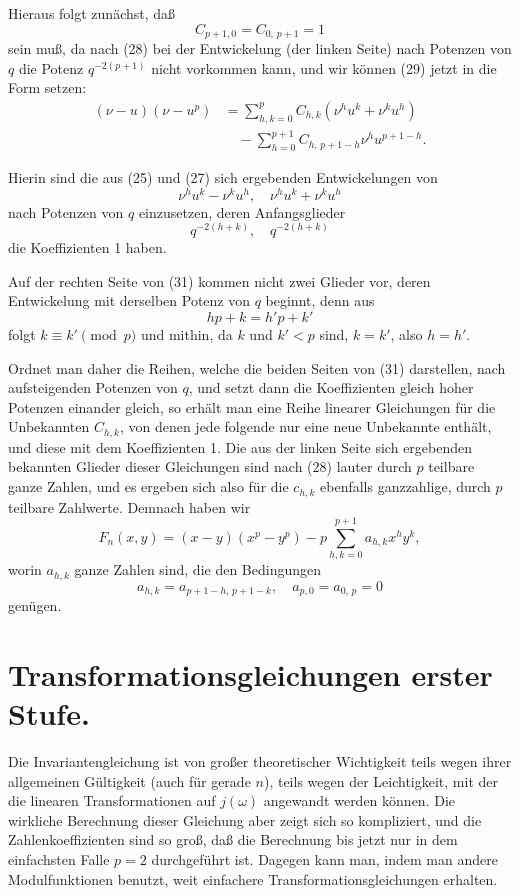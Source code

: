\documentclass[12pt,a4paper]{article}
\theoremstyle{definition}
\begin{document}
Hieraus folgt zunächst, daß
\[
C_{p+1,0} = C_{0,\,p+1} = 1
\]
sein muß, da nach (28) bei der Entwickelung (der linken Seite) nach Potenzen von $q$ die Potenz $q^{-2(p+1)}$ nicht vorkommen kann, und wir können (29) jetzt in die Form setzen:
\begin{equation}\label{eq:69-31}
\begin{aligned}
(\nu - u)(\nu - u^p) &= \sum_{h,k=0}^{p} C_{h,k} (\nu^h u^k + \nu^k u^h) \\
&\quad - \sum_{h=0}^{p+1} C_{h,\,p+1-h} \nu^h u^{p+1-h}.
\end{aligned}
\end{equation}

Hierin sind die aus (25) und (27) sich ergebenden Entwickelungen von
\[
\nu^h u^k - \nu^k u^h, \quad \nu^h u^k + \nu^k u^h
\]
nach Potenzen von $q$ einzusetzen, deren Anfangsglieder
\[
q^{-2(h+k)}, \quad q^{-2(h+k)}
\]
die Koeffizienten 1 haben.

Auf der rechten Seite von (31) kommen nicht zwei Glieder vor, deren Entwickelung mit derselben Potenz von $q$ beginnt, denn aus
\[
hp + k = h'p + k'
\]
folgt $k \equiv k' \pmod{p}$ und mithin, da $k$ und $k' < p$ sind, $k = k'$, also $h = h'$.

Ordnet man daher die Reihen, welche die beiden Seiten von (31) darstellen, nach aufsteigenden Potenzen von $q$, und setzt dann die Koeffizienten gleich hoher Potenzen einander gleich, so erhält man eine Reihe linearer Gleichungen für die Unbekannten $C_{h,k}$, von denen jede folgende nur eine neue Unbekannte enthält, und diese mit dem Koeffizienten 1. Die aus der linken Seite sich ergebenden bekannten Glieder dieser Gleichungen sind nach (28) lauter durch $p$ teilbare ganze Zahlen, und es ergeben sich also für die $c_{h,k}$ ebenfalls ganzzahlige, durch $p$ teilbare Zahlwerte. Demnach haben wir
\begin{equation}\label{eq:69-32}
F_n(x,y) = (x - y)(x^p - y^p) - p \sum_{h,k=0}^{p+1} a_{h,k} x^h y^k,
\end{equation}
worin $a_{h,k}$ ganze Zahlen sind, die den Bedingungen
\[
a_{h,k} = a_{p+1-h,\,p+1-k}, \quad a_{p,0} = a_{0,\,p} = 0
\]
genügen.


\section{Transformationsgleichungen erster Stufe.}\label{sec:70}

Die Invariantengleichung ist von großer theoretischer Wichtigkeit teils wegen ihrer allgemeinen Gültigkeit (auch für gerade $n$), teils wegen der Leichtigkeit, mit der die linearen Transformationen auf $j(\omega)$ angewandt werden können. Die wirkliche Berechnung dieser Gleichung aber zeigt sich so kompliziert, und die Zahlenkoeffizienten sind so groß, daß die Berechnung bis jetzt nur in dem einfachsten Falle $p = 2$ durchgeführt ist. Dagegen kann man, indem man andere Modulfunktionen benutzt, weit einfachere Transformationsgleichungen erhalten.
\end{document}
